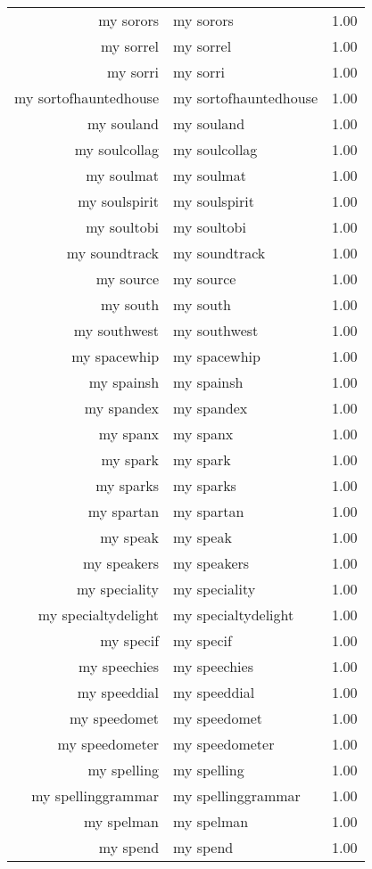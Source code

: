 \begin{table}[ht]
\begin{tabular}{rlr}
  my sorors & my sorors & 1.00 \\ 
  my sorrel & my sorrel & 1.00 \\ 
  my sorri & my sorri & 1.00 \\ 
  my sortofhauntedhouse & my sortofhauntedhouse & 1.00 \\ 
  my souland & my souland & 1.00 \\ 
  my soulcollag & my soulcollag & 1.00 \\ 
  my soulmat & my soulmat & 1.00 \\ 
  my soulspirit & my soulspirit & 1.00 \\ 
  my soultobi & my soultobi & 1.00 \\ 
  my soundtrack & my soundtrack & 1.00 \\ 
  my source & my source & 1.00 \\ 
  my south & my south & 1.00 \\ 
  my southwest & my southwest & 1.00 \\ 
  my spacewhip & my spacewhip & 1.00 \\ 
  my spainsh & my spainsh & 1.00 \\ 
  my spandex & my spandex & 1.00 \\ 
  my spanx & my spanx & 1.00 \\ 
  my spark & my spark & 1.00 \\ 
  my sparks & my sparks & 1.00 \\ 
  my spartan & my spartan & 1.00 \\ 
  my speak & my speak & 1.00 \\ 
  my speakers & my speakers & 1.00 \\ 
  my speciality & my speciality & 1.00 \\ 
  my specialtydelight & my specialtydelight & 1.00 \\ 
  my specif & my specif & 1.00 \\ 
  my speechies & my speechies & 1.00 \\ 
  my speeddial & my speeddial & 1.00 \\ 
  my speedomet & my speedomet & 1.00 \\ 
  my speedometer & my speedometer & 1.00 \\ 
  my spelling & my spelling & 1.00 \\ 
  my spellinggrammar & my spellinggrammar & 1.00 \\ 
  my spelman & my spelman & 1.00 \\ 
  my spend & my spend & 1.00 \\ 

\end{tabular}
\end{table}
